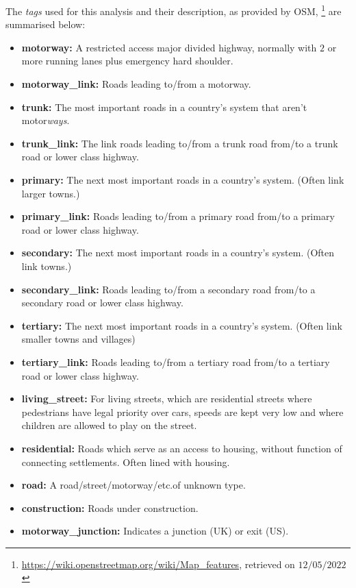 \documentclass[12pt]{article}
\theoremstyle{definition}
\begin{document}
The \textit{tags} used for this analysis and their description, as provided by OSM, \footnote{\url{https://wiki.openstreetmap.org/wiki/Map_features}, retrieved on $12/05/2022$} are summarised below:
\begin{itemize}\label{tags}
    \item \textbf{motorway:} A restricted access major divided highway, normally with $2$ or more running lanes plus emergency hard shoulder.
    \item \textbf{motorway{\_}link:} Roads leading to/from a motorway.
    \item \textbf{trunk:} The most important roads in a country's system that aren't motor\textit{ways}.
    \item \textbf{trunk{\_}link:} The link roads leading to/from a trunk road from/to a trunk road or lower class highway.
    \item \textbf{primary:} The next most important roads in a country's system. (Often link larger towns.) 
   \item \textbf{primary{\_}link:} Roads leading to/from a primary road from/to a primary road or lower class highway.
   \item \textbf{secondary:} The next most important roads in a country's system. (Often link towns.)
   \item \textbf{secondary{\_}link:} Roads leading to/from a secondary road from/to a secondary road or lower class highway.
   \item \textbf{tertiary:} The next most important roads in a country's system. (Often link smaller towns and villages)
   \item \textbf{tertiary{\_}link:} Roads leading to/from a tertiary road from/to a tertiary road or lower class highway.
   \item \textbf{living{\_}street:} For living streets, which are residential streets where pedestrians have legal priority over cars, speeds are kept very low and where children are allowed to play on the street.
   \item \textbf{residential:} Roads which serve as an access to housing, without function of connecting settlements. Often lined with housing.
   \item \textbf{road:} A road/street/motorway/etc.\texttildelow of unknown type.
   \item \textbf{construction:} Roads under construction.
   \item \textbf{motorway{\_}junction:} Indicates a junction (UK) or exit (US).
   
\end{itemize}
\end{document}
